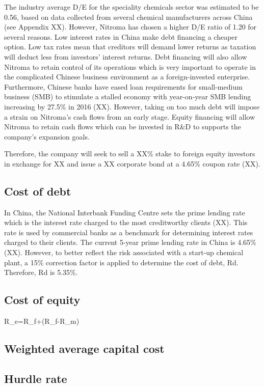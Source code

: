 The industry average D/E for the speciality chemicals sector was estimated to be 0.56, based on data collected from several chemical manufacturers across China (see Appendix XX). However, Nitroma has chosen a higher D/E ratio of 1.20 for several reasons. Low interest rates in China make debt financing a cheaper option. Low tax rates mean that creditors will demand lower returns as taxation will deduct less from investors’ interest returns. Debt financing will also allow Nitroma to retain control of its operations which is very important to operate in the complicated Chinese business environment as a foreign-invested enterprise. Furthermore, Chinese banks have eased loan requirements for small-medium business (SMB) to stimulate a stalled economy with year-on-year SMB lending increasing by 27.5\% in 2016 (XX). However, taking on too much debt will impose a strain on Nitroma’s cash flows from an early stage. Equity financing will allow Nitroma to retain cash flows which can be invested in R&D to supports the company’s expansion goals.

Therefore, the company will seek to sell a XX\% stake to foreign equity investors in exchange for XX and issue a XX corporate bond at a 4.65\% coupon rate (XX).

\subsection{Cost of debt}
In China, the National Interbank Funding Centre sets the prime lending rate which is the interest rate charged to the most creditworthy clients (XX). This rate is used by commercial banks as a benchmark for determining interest rates charged to their clients. The current 5-year prime lending rate in China is 4.65\% (XX). However, to better reflect the risk associated with a start-up chemical plant, a 15\% correction factor is applied to determine the cost of debt, Rd. Therefore, Rd is 5.35\%.

\subsection{Cost of equity}

R_{e}=R_{f}+\beta(R_{f}-R_{m})

\subsection{Weighted average capital cost}
\subsection{Hurdle rate}